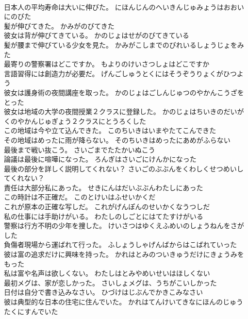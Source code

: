 \documentclass[8pt]{extreport}
\begin{document}
\begin{CJK}{UTF8}{min}
\\	日本人の平均寿命は大いに伸びた。	にほんじんのへいきんじゅみょうはおおいにのびた 
\\	髪が伸びてきた。	かみがのびてきた 
\\	彼女は背が伸びてきている。	かのじょはせがのびてきている 
\\	髪が腰まで伸びている少女を見た。	かみがこしまでのびれいるしょうじょをみた 
\\	最寄りの警察署はどこですか。	もよりのけいさつしょはどこですか 
\\	言語習得には創造力が必要だ。	げんごしゅうとくにはそうぞうりょくがひつよう 
\\	彼女は護身術の夜間講座を取った。	かのじょはごしんじゅつのやかんこうざをとった 
\\	彼女は地域の大学の夜間授業２クラスに登録した。	かのじょはちいきのだいがくのやかんじゅぎょう２クラスにとうろくした 
\\	この地域は今や立て込んできた。	このちいきはいまやたてこんできた 
\\	その地域はめったに雨が降らない。	そのちいきはめったにあめがふらない 
\\	最後まで戦い抜こう。	さいごまでたたかいぬこう 
\\	論議は最後に喧嘩になった。	ろんぎはさいごにけんかになった 
\\	最後の部分を詳しく説明してくれない？	さいごのぶぶんをくわしくせつめいしてくれない？ 
\\	責任は大部分私にあった。	せきにんはだいぶぶんわたしにあった 
\\	この時計は不正確だ。	このとけいはふせいかくだ 
\\	これが原本の正確な写しだ。	これがげんぽんのせいかくなうつしだ 
\\	私の仕事には手助けがいる。	わたしのしごとにはてたすけがいる 
\\	警察は行方不明の少年を捜した。	けいさつはゆくえふめいのしょうねんをさがした 
\\	負傷者現場から運ばれて行った。	ふしょうしゃげんばからはこばれていった 
\\	彼は富の追求だけに興味を持った。	かれはとみのついきゅうだけにきょうみをもった 
\\	私は富や名声は欲しくない。	わたしはとみやめいせいはほしくない 
\\	最初メグは、家が恋しかった。	さいしょメグは、うちがこいしかった 
\\	日付は自分で書き込みなさい。	ひづけはじぶんでかきこみなさい 
\\	彼は典型的な日本の住宅に住んでいた。	かれはてんけいてきなにほんのじゅうたくにすんでいた 

\end{CJK}
\end{document}
